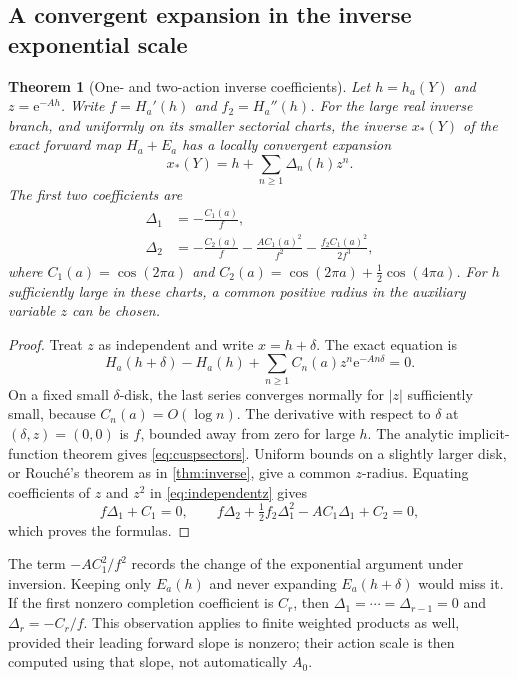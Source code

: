 \documentclass[11pt,a4paper]{article}
\numberwithin{equation}{section}
\newtheorem{theorem}{Theorem}[section]
\theoremstyle{definition}
\theoremstyle{remark}
\newcommand{\e}{\mathrm e}
\begin{document}
\subsection{A convergent expansion in the inverse exponential scale}
\begin{theorem}[One- and two-action inverse coefficients]
\label{thm:cusp}
Let $h=h_a(Y)$ and $z=\e^{-Ah}$. Write
$f=H_a'(h)$ and $f_2=H_a''(h)$. For the large real inverse branch, and
uniformly on its smaller sectorial charts, the inverse $x_*(Y)$ of the
exact forward map $H_a+E_a$ has a locally convergent expansion
\begin{equation}
 x_*(Y)=h+\sum_{n\geq1}\Delta_n(h)z^n.
 \label{eq:cuspsectors}
\end{equation}
The first two coefficients are
\begin{align}
 \Delta_1&=-\frac{C_1(a)}f,\label{eq:Delta1}\\
 \Delta_2&=-\frac{C_2(a)}f-\frac{A C_1(a)^2}{f^2}
                         -\frac{f_2C_1(a)^2}{2f^3},
 \label{eq:Delta2}
\end{align}
where $C_1(a)=\cos(2\pi a)$ and
$C_2(a)=\cos(2\pi a)+\frac12\cos(4\pi a)$.
For $h$ sufficiently large in these charts, a common positive radius
in the auxiliary variable $z$ can be chosen.
\end{theorem}
\begin{proof}
Treat $z$ as independent and write $x=h+\delta$. The exact equation is
\begin{equation}
 H_a(h+\delta)-H_a(h)
 +\sum_{n\geq1}C_n(a)z^n\e^{-An\delta}=0.
 \label{eq:independentz}
\end{equation}
On a fixed small $\delta$-disk, the last series converges normally for
$|z|$ sufficiently small, because $C_n(a)=O(\log n)$. The derivative
with respect to $\delta$ at $(\delta,z)=(0,0)$ is $f$, bounded away
from zero for large $h$. The analytic implicit-function theorem gives
\eqref{eq:cuspsectors}. Uniform bounds on a slightly larger disk, or
Rouch\'e's theorem as in \cref{thm:inverse}, give a common $z$-radius.
Equating coefficients of $z$ and $z^2$ in
\eqref{eq:independentz} gives
\[
 f\Delta_1+C_1=0,\qquad
 f\Delta_2+\tfrac12 f_2\Delta_1^2-A C_1\Delta_1+C_2=0,
\]
which proves the formulas.
\end{proof}

The term $-AC_1^2/f^2$ records the change of the exponential argument
under inversion. Keeping only $E_a(h)$ and never expanding
$E_a(h+\delta)$ would miss it. If the first nonzero completion
coefficient is $C_r$, then $\Delta_1=\cdots=\Delta_{r-1}=0$ and
$\Delta_r=-C_r/f$. This observation applies to finite weighted products
as well, provided their leading forward slope is nonzero; their action
scale is then computed using that slope, not automatically $A_0$.
\end{document}
